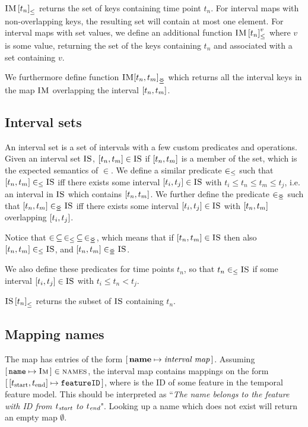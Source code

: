 ${\textsc{IM} \left[ t_n \right]}_{\leq}$ returns the set of keys containing time point $t_n$. For interval maps with non-overlapping keys, the resulting set will contain at most one element. For interval maps with set values, we define an additional function ${\textsc{IM} \left[ t_n \right]^{v}_{\leq}}$ where $v$ is some value, returning the set of the keys containing $t_n$ and associated with a set containing $v$. 

We furthermore define function $\overlapping{\map{IM}}{t_n}{t_m}$ which returns all the interval keys in the map $\textsc{IM}$ overlapping the interval $\interval{t_n}{t_m}$. 

\subsection{Interval sets}
\label{sub:interval-sets}
An interval set is a set of intervals with a few custom predicates and operations. Given an interval set $\textsc{IS}$, $\interval{t_n}{t_m} \in \map{IS}$ if $\interval{t_n}{t_m}$ is a member of the set, which is the expected semantics of $\in$. We define a similar predicate $\in_\leq$ such that $\interval{t_n}{t_m} \inn \map{IS}$ iff there exists some interval $\interval{t_i}{t_j} \in \map{IS}$ with $t_i \leq t_n \leq t_m \leq t_j$, i.e. an interval in $\textsc{IS}$ which contains $\interval{t_n}{t_m}$. We further define the predicate $\in_{\leq\!\!\!\!\geq}$ such that $\interval{t_n}{t_m} \innr \map{IS}$ iff there exists some interval $\interval{t_i}{t_j} \in \map{IS}$ with $\interval{t_n}{t_m}$ overlapping $\interval{t_i}{t_j}$. 

Notice that $\in \, \subseteq \, \in_\leq \, \subseteq \, \in_{\leq\!\!\!\!\geq}$, which means that if $\interval{t_n}{t_m} \in \map{IS}$ then also $\interval{t_n}{t_m} \inn \map{IS}$, and $\interval{t_n}{t_m} \innr \map{IS}$. 

We also define these predicates for time points $t_n$, so that $t_n \in_\leq \textsc{IS}$ if some interval $\interval{t_i}{t_j} \in \map{IS}$ with $t_i \leq t_n < t_j$. 

${\textsc{IS} \left[ t_n \right]}_{\leq}$ returns the subset of $\textsc{IS}$ containing $t_n$.

\subsection{Mapping names}
\label{sub:mapping-names}

The \names{} map has entries of the form $[ \,\textbf{name}{} \mapsto \textit{interval map}\, ]$. Assuming $[ \,\texttt{name} \mapsto \textsc{Im}\, ] \in \textsc{names}$, the interval map  contains mappings on the form $\intervalmapping{t_\text{start}}{t_\text{end}}{\var{featureID}}$, where  is the ID of some feature in the temporal feature model. This should be interpreted as ``\emph{The name \emph{} belongs to the feature with ID \emph{} from $t_{\emph{\text{start}}}$ to $t_{\emph{\text{end}}}$}". Looking up a name which does not exist will return an empty map $\emptyset$. 

